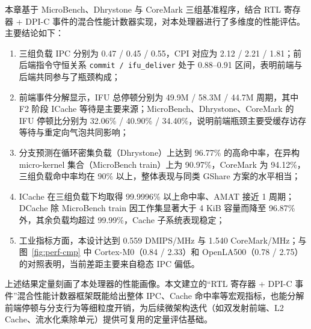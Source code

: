 本章基于 MicroBench、Dhrystone 与 CoreMark 三组基准程序，结合 RTL 寄存器 + DPI-C 事件的混合性能计数器实现，对本处理器进行了多维度的性能评估。主要结论如下：

\begin{enumerate}
  \item 三组负载 IPC 分别为 0.47 / 0.45 / 0.55，CPI 对应为 2.12 / 2.21 / 1.81；前后端指令守恒关系 \lstinline|commit / ifu_deliver| 处于 0.88--0.91 区间，表明前端与后端共同参与了瓶颈构成；
  \item 前端事件分解显示，IFU 总停顿分别为 49.9M / 58.3M / 44.7M 周期，其中 F2 阶段 ICache 等待是主要来源；MicroBench、Dhrystone、CoreMark 的 IFU 停顿比分别为 32.06\% / 40.90\% / 34.40\%，说明前端瓶颈主要受缓存访存等待与重定向气泡共同影响；
  \item 分支预测在循环密集负载（Dhrystone）上达到 96.77\% 的高命中率，在异构 micro-kernel 集合（MicroBench train）上为 90.97\%，CoreMark 为 94.12\%，三组负载命中率均在 90\% 以上，整体表现与同类 GShare 方案的水平相当；
  \item ICache 在三组负载下均取得 99.9996\% 以上命中率、AMAT 接近 1 周期；DCache 除 MicroBench train 因工作集显著大于 4 KiB 容量而降至 96.87\% 外，其余负载均超过 99.99\%，Cache 子系统表现稳定；
  \item 工业指标方面，本设计达到 0.559 DMIPS/MHz 与 1.540 CoreMark/MHz；与图~\ref{fig:perf-cmp} 中 Cortex-M0（0.84 / 2.33）和 OpenLA500（0.78 / 2.75）的对照表明，当前差距主要来自稳态 IPC 偏低。
\end{enumerate}

上述结果定量刻画了本处理器的性能画像。本文建立的“RTL 寄存器 + DPI-C 事件”混合性能计数器框架既能给出整体 IPC、Cache 命中率等宏观指标，也能分解前端停顿与分支行为等细粒度开销，为后续微架构迭代（如双发射前端、L2 Cache、流水化乘除单元）提供可复用的定量评估基础。
